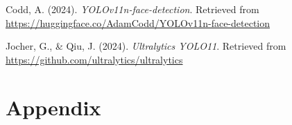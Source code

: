 \documentclass[
  man,floatsintext]{apa6}
\newlength{\cslhangindent}
\newenvironment{CSLReferences}[2] %
 {\begin{list}{}{%
  \setlength{\itemindent}{0pt}
  \setlength{\leftmargin}{0pt}
  \setlength{\parsep}{0pt}
  \ifodd #1
   \setlength{\leftmargin}{\cslhangindent}
   \setlength{\itemindent}{-1\cslhangindent}
  \fi
  \setlength{\itemsep}{#2\baselineskip}}}
 {\end{list}}
\begin{document}
\newpage

\begingroup
\setlength{\parindent}{-0.5in}
\setlength{\leftskip}{0.5in}

\label{refs}
\begin{CSLReferences}{1}{0}
Codd, A. (2024). \emph{{YOLOv11n-face-detection}}. Retrieved from \url{https://huggingface.co/AdamCodd/YOLOv11n-face-detection}

Jocher, G., \& Qiu, J. (2024). \emph{Ultralytics {YOLO11}}. Retrieved from \url{https://github.com/ultralytics/ultralytics}

\end{CSLReferences}

\endgroup

\newpage

\section{Appendix}\label{appendix}
\end{document}
